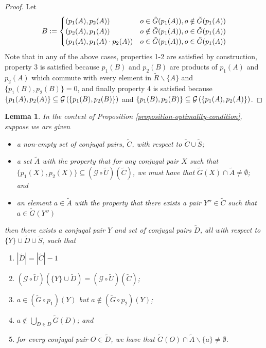 \documentclass[twocolumn,showpacs,preprintnumbers,amsmath,amssymb,nofootinbib,pra,floatfix]{revtex4-1}
\newtheorem{lemma}{Lemma}
\newcommand{\set}{\tilde}
\newcommand{\genfun}{\mathcal{G}}
\begin{document}
\begin{proof}
Let
$$
B:=
\begin{cases}
\paren{p_1(A),p_2(A)} & o\in \set G(p_1(A)), o\notin \set G(p_1(A)) \\
\paren{p_2(A),p_1(A)} & o\notin \set G(p_1(A)), o\in\set G(p_1(A)) \\
\paren{p_1(A),p_1(A)\cdot p_2(A)} & o\in\set G(p_1(A)), o\in\set G(p_1(A)) \\
\end{cases}
$$
Note that in any of the above cases, properties 1-2 are satisfied by construction, property 3 is satisfied because $p_1(B)$ and $p_2(B)$ are products of $p_1(A)$ and $p_2(A)$ which commute with every element in $\set R\backslash\{A\}$ and $\{p_1(B),p_2(B)\}=0$, and finally property 4 is satisfied because $\{p_1(A),p_2(A)\}\subseteq \genfun\paren{\{p_1(B),p_2(B)\}}$ and $\{p_1(B),p_2(B)\}\subseteq \genfun\paren{\{p_1(A),p_2(A)\}}$.
\end{proof}
\begin{lemma}
\label{directed-gaussian-elimination-of-logicals}
In the context of Proposition \ref{proposition-optimality-condition}, suppose we are given
\begin{itemize}
\item a non-empty set of conjugal pairs, $\set C$, with respect to $\set C \cup \set S$;
\item a set $\set A$ with the property that for any conjugal pair $X$ such that $\{p_1(X),p_2(X)\}\subseteq(\genfun\circ\set U)(\set C)$, we must have that $\set G(X) \cap \set A \ne \emptyset$; and
\item an element $a\in \set A$ with the property that there exists a pair $Y''\in\set C$ such that $a\in\set G(Y'')$
\end{itemize}
then there exists a conjugal pair $Y$ and set of conjugal pairs $\set D$, all with respect to $\{Y\}\cup \set D \cup \set S$, such that
\begin{enumerate}
\item $|\set D| = |\set C|-1$
\item $(\genfun\circ\set U)(\{Y\}\cup \set D)=(\genfun\circ\set U)(\set C)$;
\item $a\in (\set G\circ p_1)(Y)$ but $a\notin (\set G\circ p_2)(Y)$;
\item $a\notin \bigcup_{D\in \set D} \set G(D)$; and
\item for every conjugal pair $O\in\set D$, we have that $\set G(O) \cap \set A\backslash \{a\} \ne \emptyset$.
\end{enumerate}
\end{lemma}
\end{document}
